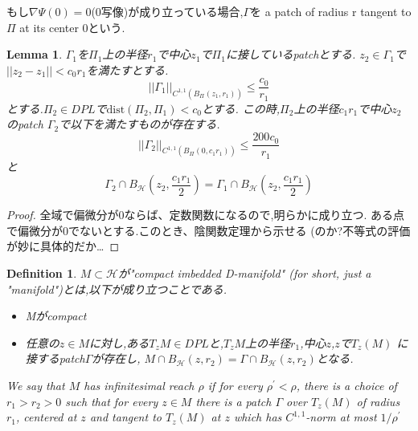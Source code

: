 \documentclass{ujarticle}
\newtheorem{dfn}[thm]{Definition}
\newtheorem{lem}[thm]{Lemma}
\newcommand{\bh}[2]{B_{\mathcal{H}}(#1,#2)}
\newcommand{\bp}[3]{B_{\Pi_{#3}}(#1,#2)}
\newcommand{\gn}[4]{||\Gamma_{#1}||_{C^{1,1}(\bp{#2}{#3}{#4})}}
\newcommand{\gnaaad}{||\Gamma_1||_{C^{1,1}(\bp{z_1}{r_1}{})}}
\begin{document}
もし$ \nabla \Psi(0)=0$(0写像)が成り立っている場合,$\Gamma$を
a patch of radius r tangent to $\Pi$ at its center 0という.

\begin{lem}
  $\Gamma_1$を$\Pi_1$上の半径$r_1$で中心$z_1$で$\Pi_1$に接しているpatchとする.
  $z_2 \in \Gamma_1$で$||z_2 -z_1 || < c_0r_1$を満たすとする.
  \begin{equation*}
   \gnaaad \le \frac{c_0}{r_1}
  \end{equation*}
  とする.$\Pi_2 \in DPL$で$\mathrm{dist}(\Pi_2,\Pi_1) <c_0$とする.
  この時,$\Pi_2$上の半径$c_1r_1$で中心$z_2$のpatch $\Gamma_2$で以下を満たすものが存在する.
  \begin{equation*}
   \gn{2}{0}{c_1r_1}{} \le \frac{200c_0}{r_1}
  \end{equation*}
と
\begin{equation*}
\Gamma_2 \cap \bh{z_2}{\frac{c_1r_1}{2}} = \Gamma_1 \cap \bh{z_2}{\frac{c_1r_1}{2}}
\end{equation*}
\end{lem}
\begin{proof}
  全域で偏微分が0ならば、定数関数になるので,明らかに成り立つ.
  ある点で偏微分が0でないとする.このとき、陰関数定理から示せる
  (のか?不等式の評価が妙に具体的だか…
\end{proof}

\begin{dfn}
  $M \subset \mathcal{H}$が"compact imbedded D-manifold" (for short, just a "manifold")とは,以下が成り立つことである.
\begin{itemize}
  \item Mがcompact
  \item 任意の$z \in M$に対し,ある$T_zM \in DPL$と,$T_zM$上の半径$r_1$,中心$z$,$z$で$T_z(M)$
  に接するpatch$\Gamma$が存在し,
  $M \cap B_{\mathcal{H}}(z,r_2)=\Gamma \cap B_{\mathcal{H}}(z,r_2)$となる.
\end{itemize}
We say that $M$ has infinitesimal reach $\rho$ if for every $\rho^{\prime} < \rho$, there is a choice of $r_1 > r_2 > 0$ such that
for every $z \in M$ there is a patch $\Gamma$ over $T_z(M)$ of radius $r_1$, centered at $z$ and tangent to $T_z(M)$ at $z$ which has $C^{1,1}$-norm at most $1/\rho^{\prime}$
\end{dfn}
\end{document}
